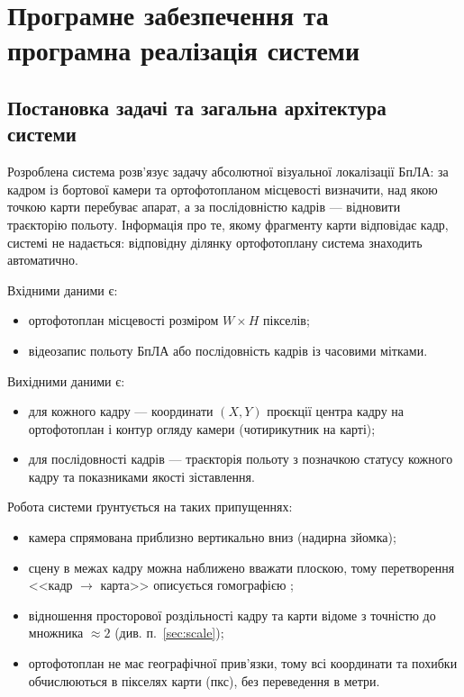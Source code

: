 \providecommand{\px}{пкс}               %
\providecommand{\code}[1]{\texttt{#1}}  %
\newpage
\section{Програмне забезпечення та програмна реалізація системи}
\label{sec:implementation}

\subsection{Постановка задачі та загальна архітектура системи}

Розроблена система розв'язує задачу абсолютної візуальної локалізації БпЛА: за кадром із бортової камери та ортофотопланом місцевості визначити, над якою точкою карти перебуває апарат, а за послідовністю кадрів --- відновити траєкторію польоту. Інформація про те, якому фрагменту карти відповідає кадр, системі не надається: відповідну ділянку ортофотоплану система знаходить автоматично.

Вхідними даними є:
\begin{itemize}
    \item ортофотоплан місцевості розміром $W \times H$ пікселів;
    \item відеозапис польоту БпЛА або послідовність кадрів із часовими мітками.
\end{itemize}

Вихідними даними є:
\begin{itemize}
    \item для кожного кадру --- координати $(X, Y)$ проєкції центра кадру на ортофотоплан і контур огляду камери (чотирикутник на карті);
    \item для послідовності кадрів --- траєкторія польоту з позначкою статусу кожного кадру та показниками якості зіставлення.
\end{itemize}

Робота системи ґрунтується на таких припущеннях:
\begin{itemize}
    \item камера спрямована приблизно вертикально вниз (надирна зйомка);
    \item сцену в межах кадру можна наближено вважати плоскою, тому перетворення <<кадр $\to$ карта>> описується гомографією \cite{hartley};
    \item відношення просторової роздільності кадру та карти відоме з точністю до множника $\approx 2$ (див. п.~\ref{sec:scale});
    \item ортофотоплан не має географічної прив'язки, тому всі координати та похибки обчислюються в пікселях карти (\px{}), без переведення в метри.
\end{itemize}

